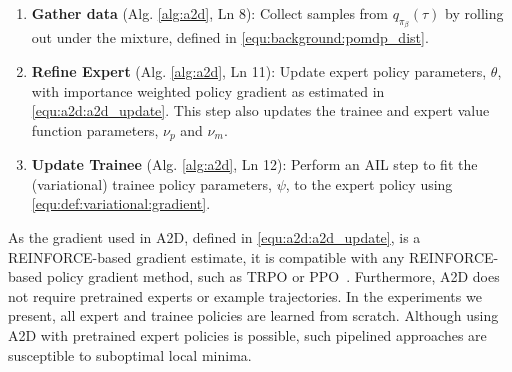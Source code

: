 \begin{enumerate}[topsep=0pt]
    \item \textbf{Gather data} (Alg. \ref{alg:a2d}, Ln 8): Collect samples from $q_{\pi_{\beta}}(\tau)$ by rolling out under the mixture, defined in \eqref{equ:background:pomdp_dist}.
    \item \textbf{Refine Expert} (Alg. \ref{alg:a2d}, Ln 11):  Update expert policy parameters, $\theta$, with importance weighted policy gradient as estimated in \eqref{equ:a2d:a2d_update}.  This step also updates the trainee and expert value function parameters, $\nu_p$ and $\nu_m$.
    \item \textbf{Update Trainee} (Alg. \ref{alg:a2d}, Ln 12): Perform an AIL step to fit the (variational) trainee policy parameters, $\psi$, to the expert policy using \eqref{equ:def:variational:gradient}. 
\end{enumerate}
As the gradient used in A2D, defined in \eqref{equ:a2d:a2d_update}, is a REINFORCE-based gradient estimate, it is compatible with any REINFORCE-based policy gradient method, such as TRPO or PPO~\cite{schulman2015trust, schulman2017proximal}.  Furthermore, A2D does not require pretrained experts or example trajectories.  In the experiments we present, all expert and trainee policies are learned from scratch.  Although using A2D with pretrained expert policies is possible, such pipelined approaches are susceptible to suboptimal local minima.  
 



